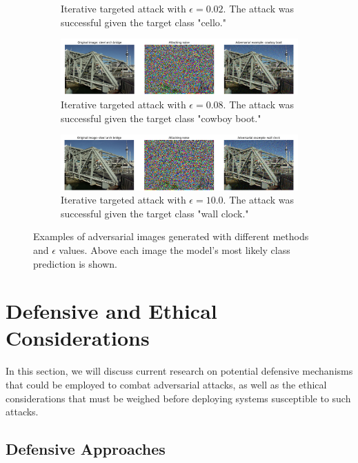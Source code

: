 \documentclass[]{article}
\begin{document}
\begin{figure}
\begin{subfigure}{0.9\textwidth}
        \caption{Iterative targeted attack with $\epsilon=0.02$. The attack was successful given the target class "cello."}
        \label{fig:adv_02_targ}
    \end{subfigure}
    \begin{subfigure}{0.9\textwidth}
        \includegraphics[width=\linewidth]{adv_08_targ.png}
        \caption{Iterative targeted attack with $\epsilon=0.08$. The attack was successful given the target class "cowboy boot."}
        \label{fig:adv_08_targ}
    \end{subfigure}
    \begin{subfigure}{0.9\textwidth}
        \includegraphics[width=\linewidth]{adv_10_targ.png}
        \caption{Iterative targeted attack with $\epsilon=10.0$. The attack was successful given the target class "wall clock."}
        \label{fig:adv_10_targ}
    \end{subfigure}
    \caption{Examples of adversarial images generated with different methods and $\epsilon$ values. Above each image the model's most likely class prediction is shown.}
    \label{fig:adv_examples}
\end{figure}


\section{Defensive and Ethical Considerations}

In this section, we will discuss current research on potential defensive mechanisms that could be employed to combat adversarial attacks, as well as the ethical considerations that must be weighed before deploying systems susceptible to such attacks.

\subsection{Defensive Approaches}
\end{document}

